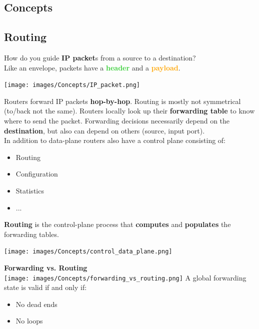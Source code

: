 \documentclass[a4paper, fontsize=8pt, landscape, DIV=1]{scrartcl}
\begin{document}
\begin{multicols*}{4}
			\section{Concepts}
			\subsection{Routing}
			How do you guide \textbf{IP packet}s from a source to a destination? \\
			Like an envelope, packets have a \textcolor{LimeGreen}{\textbf{header}} and a \textcolor{Orange}{\textbf{payload}}.\\ 
			\begin{center}
			\texttt{[image: images/Concepts/IP\_packet.png]}
			\end{center}
			Routers forward IP packets \textbf{hop-by-hop}. Routing is mostly not symmetrical (to/back not the same). Routers locally look up their \textbf{forwarding table} to know where to send the packet. Forwarding decisions necessarily depend on the \textbf{destination}, but also can depend on others (source, input port).\\
			In addition to data-plane routers also have a control plane consisting of:
			\vspace{-0.2cm}
			\begin{itemize}[noitemsep]
				\item Routing
				\item Configuration
				\item Statistics
				\item ... 
			\end{itemize}  
			\textbf{Routing} is the control-plane process that \textbf{computes} and \textbf{populates} the forwarding tables.
			\begin{center}
				\texttt{[image: images/Concepts/control\_data\_plane.png]}
			\end{center}
			\textbf{Forwarding vs. Routing}\\
			\vspace{0.1cm}	
			\texttt{[image: images/Concepts/forwarding\_vs\_routing.png]}
			A global forwarding state is valid if and only if:
			\begin{itemize}[noitemsep]
				\item No dead ends
				\item No loops
			\end{itemize} 
		

\end{multicols*}
\end{document}
